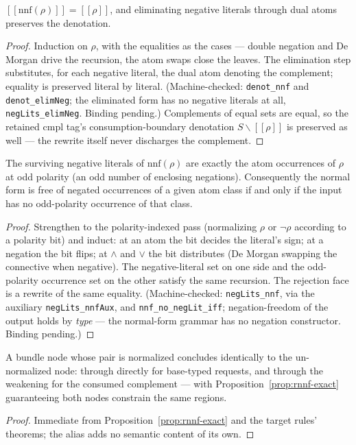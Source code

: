 \begin{bprop}
\label{prop:rnnf-exact}
$[\![\mathrm{nnf}(\rho)]\!] = [\![\rho]\!]$, and eliminating negative
literals through dual atoms preserves the denotation.
\end{bprop}
\begin{proof}
Induction on $\rho$, with the  equalities as the
cases --- double negation and De Morgan drive the recursion, the atom
swaps close the leaves. The elimination step substitutes, for each
negative literal, the dual atom denoting the complement; equality is
preserved literal by literal. (Machine-checked: \texttt{denot\_nnf} and
\texttt{denot\_elimNeg}; the eliminated form has no negative literals at
all, \texttt{negLits\_elimNeg}. Binding pending.) Complements of equal
sets are equal, so the retained $\mathrm{cmpl}$ tag's
consumption-boundary denotation $S \smallsetminus [\![\rho]\!]$ is
preserved as well --- the rewrite itself never discharges the
complement.
\end{proof}

\begin{bprop}\label{prop:rnnf-polarity}
The surviving negative literals of $\mathrm{nnf}(\rho)$ are exactly the
atom occurrences of $\rho$ at odd polarity (an odd number of enclosing
negations). Consequently the normal form is free of negated occurrences
of a given atom class if and only if the input has no odd-polarity
occurrence of that class.
\end{bprop}
\begin{proof}
Strengthen to the polarity-indexed pass (normalizing $\rho$ or
$\neg\rho$ according to a polarity bit) and induct: at an atom the bit
decides the literal's sign; at a negation the bit flips; at $\wedge$ and
$\vee$ the bit distributes (De Morgan swapping the connective when
negative). The negative-literal set on one side and the odd-polarity
occurrence set on the other satisfy the same recursion. The rejection
face is a rewrite of the same equality. (Machine-checked:
\texttt{negLits\_nnf}, via the auxiliary \texttt{negLits\_nnfAux}, and
\texttt{nnf\_no\_negLit\_iff}; negation-freedom of the output holds by
\emph{type} --- the normal-form grammar has no negation constructor.
Binding pending.)
\end{proof}

\begin{bprop}\label{prop:rnnf-sound}
A bundle node whose pair is normalized concludes identically to the
un-normalized node: through  directly for
base-typed requests, and through the 
weakening for the consumed complement --- with
Proposition~\ref{prop:rnnf-exact} guaranteeing both nodes constrain the
same regions.
\end{bprop}
\begin{proof}
Immediate from Proposition~\ref{prop:rnnf-exact} and the target rules'
theorems; the alias adds no semantic content of its own.
\end{proof}


